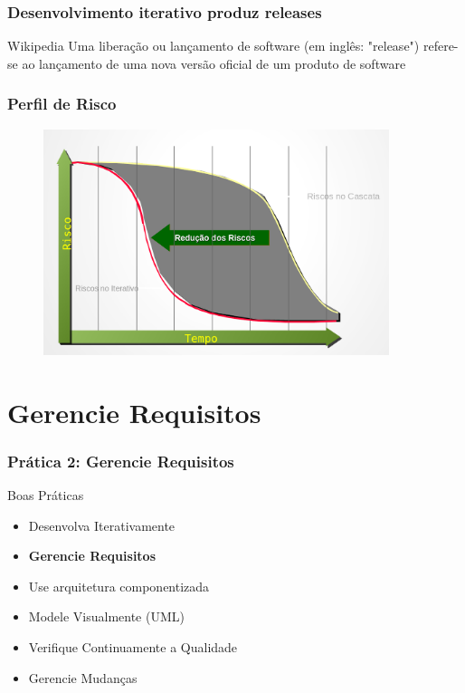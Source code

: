 \begin{frame}
 \frametitle{Desenvolvimento iterativo produz releases}
\begin{block}{Wikipedia}
 Uma liberação ou lançamento de software (em inglês: "release") refere-se ao lançamento de uma nova versão oficial de um produto de software
\end{block}

\end{frame}


\begin{frame}
 \frametitle{Perfil de Risco}
  \begin{figure}
   \centering
   \includegraphics[width = 0.9\textwidth]{figs/fig9.png}
  \end{figure}
\end{frame}
\section{Gerencie Requisitos}
\begin{frame}
 \frametitle{Prática 2: Gerencie Requisitos}
 \begin{block}{Boas Práticas}
 \begin{itemize}
  \item Desenvolva Iterativamente
  \item \textbf{Gerencie Requisitos}
  \item Use arquitetura componentizada
  \item  Modele Visualmente (UML)
  \item  Verifique Continuamente a Qualidade
  \item Gerencie Mudanças  
 \end{itemize}
\end{block}
\end{frame}

